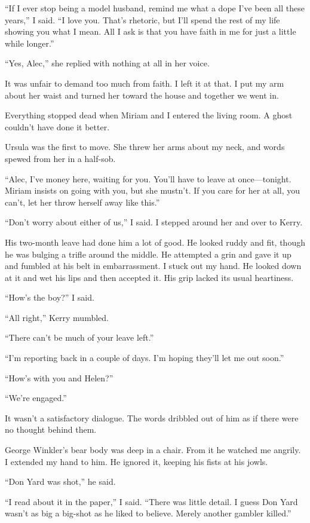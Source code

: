 \documentclass{novel}
\begin{document}
“If I ever stop being a model husband, remind me what a dope I’ve been all these years,” I said. “I love you. That’s rhetoric, but I’ll spend the rest of my life showing you what I mean. All I ask is that you have faith in me for just a little while longer.”

“Yes, Alec,” she replied with nothing at all in her voice.

It was unfair to demand too much from faith. I left it at that. I put my arm about her waist and turned her toward the house and together we went in.

Everything stopped dead when Miriam and I entered the living room. A ghost couldn’t have done it better.

Ursula was the first to move. She threw her arms about my neck, and words spewed from her in a half-sob.

“Alec, I’ve money here, waiting for you. You’ll have to leave at once—tonight. Miriam insists on going with you, but she mustn’t. If you care for her at all, you can’t, let her throw herself away like this.”

“Don’t worry about either of us,” I said. I stepped around her and over to Kerry.

His two-month leave had done him a lot of good. He looked ruddy and fit, though he was bulging a trifle around the middle. He attempted a grin and gave it up and fumbled at his belt in embarrassment. I stuck out my hand. He looked down at it and wet his lips and then accepted it. His grip lacked its usual heartiness.

“How’s the boy?” I said.

“All right,” Kerry mumbled.

“There can’t be much of your leave left.”

“I’m reporting back in a couple of days. I’m hoping they’ll let me out soon.”

“How’s with you and Helen?”

“We’re engaged.”

It wasn’t a satisfactory dialogue. The words dribbled out of him as if there were no thought behind them.

\scenestars

George Winkler’s bear body was deep in a chair. From it he watched me angrily. I extended my hand to him. He ignored it, keeping his fists at his jowls.

“Don Yard was shot,” he said.

“I read about it in the paper,” I said. “There was little detail. I guess Don Yard wasn’t as big a big-shot as he liked to believe. Merely another gambler killed.”
\end{document}
